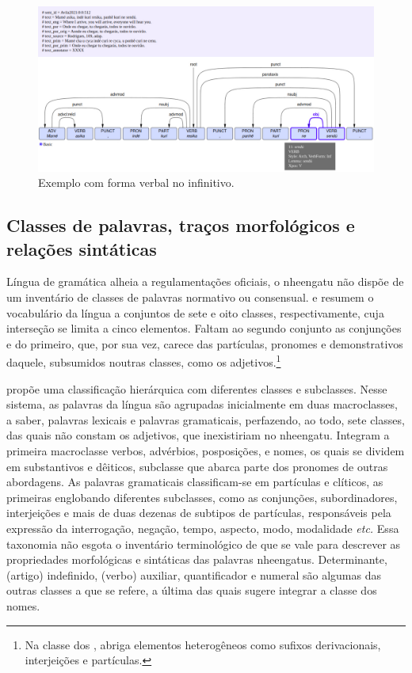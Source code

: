 \documentclass[portuguese]{textolivre}
\begin{document}
\begin{figure}[htbp]
  \centering
  \begin{minipage}{.75\textwidth}
    \includegraphics[width=\linewidth]{figures/senu.pdf}
    \caption{Exemplo com forma verbal no infinitivo.}
    \label{fig:senu}
  \end{minipage}
\end{figure}

\subsection{Classes de palavras, traços morfológicos e relações sintáticas}\label{classes}
Língua de gramática alheia a regulamentações oficiais, o nheengatu não dispõe de um inventário de classes de palavras normativo ou consensual. \textcite{sympson1877} e \textcite{moore-facundes-pires-1994} resumem o vocabulário da língua a conjuntos de sete e oito classes, respectivamente, cuja interseção se limita a cinco elementos. Faltam ao segundo conjunto as conjunções e  do primeiro, que, por sua vez, carece das partículas, pronomes e demonstrativos daquele, subsumidos noutras classes, como os adjetivos.\footnote{Na classe dos , \textcite{sympson1877} abriga elementos heterogêneos como sufixos derivacionais, interjeições e partículas.} 

\textcite{cruz2011} propõe uma classificação hierárquica com diferentes classes e subclasses. Nesse sistema, as palavras da língua são agrupadas inicialmente em duas macroclasses, a saber, palavras lexicais e palavras gramaticais, perfazendo, ao todo, sete classes, das quais não constam os adjetivos, que inexistiriam no nheengatu. Integram a primeira macroclasse verbos, advérbios, posposições,  e nomes, os quais se dividem em substantivos e dêiticos, subclasse que abarca parte dos pronomes de outras abordagens. As palavras gramaticais classificam-se em partículas e clíticos, as primeiras englobando diferentes subclasses, como as conjunções, subordinadores, interjeições e mais de duas dezenas de subtipos de partículas, responsáveis pela expressão da interrogação, negação, tempo, aspecto, modo, modalidade 	\textit{etc.} Essa taxonomia não esgota o inventário terminológico de que \textcite{cruz2011} se vale para descrever as propriedades morfológicas e sintáticas das palavras nheengatus. Determinante, (artigo) indefinido, (verbo) auxiliar, quantificador e numeral são algumas das outras classes a que se refere, a última das quais sugere integrar a classe dos nomes.  
\end{document}
